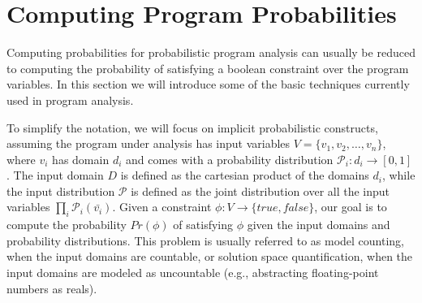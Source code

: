 \section{Computing Program Probabilities}
\label{sec:computingprobabilities}





Computing probabilities for probabilistic program analysis can usually be reduced to computing the probability of satisfying a boolean constraint over the program variables. In this section we will introduce some of the basic techniques currently used in program analysis. 

To simplify the notation, we will focus on implicit probabilistic constructs, assuming the program under analysis has input variables $V=\{v_1, v_2, \dots, v_n\}$, where $v_i$ has domain $d_i$ and comes with a probability distribution $\mathcal{P}_i: d_i \to [0, 1]$. The input domain $D$ is defined as the cartesian product of the domains $d_i$, while the input distribution $\mathcal{P}$ is defined as the joint distribution over all the input variables $\prod_i \mathcal{P}_i(\bar{v_i})$. Given a constraint $\phi: V \to \{true, false\}$, our goal is to compute the probability $Pr(\phi)$ of satisfying $\phi$ given the input domains and probability distributions. This problem is usually referred to as model counting, when the input domains are countable, or solution space quantification, when the input domains are modeled as uncountable (e.g., abstracting floating-point numbers as reals).



